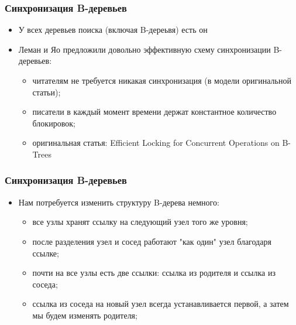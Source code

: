 \begin{frame}
\frametitle{Синхронизация B-деревьев}
\begin{itemize}
  \item<1-> У всех деревьев поиска (включая B-дереьвя) есть он 
  \item<4-> Леман и Яо предложили довольно эффективную схему синхронизации B-деревьев:
    \begin{itemize}
      \item читателям не требуется никакая синхронизация (в модели оригинальной статьи);
      \item писатели в каждый момент времени держат константное количество блокировок;
      \item оригинальная статья: Efficient Locking for Concurrent Operations on B-Trees
    \end{itemize}
\end{itemize}
\end{frame}

\begin{frame}
\frametitle{Синхронизация B-деревьев}
\begin{itemize}
  \item<1-> Нам потребуется изменить структуру B-дерева немного:
    \begin{itemize}
      \item все узлы хранят ссылку на следующий узел того же уровня;
      \item после разделения узел и сосед работают "как один" узел благодаря ссылке;
      \item почти на все узлы есть две ссылки: ссылка из родителя и ссылка из соседа;
      \item ссылка из соседа на новый узел всегда устанавливается первой, а затем мы будем изменять родителя;
    \end{itemize}
\end{itemize}
\end{frame}

